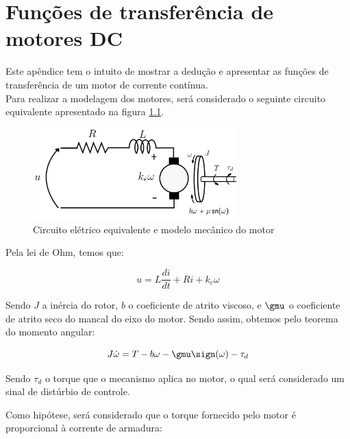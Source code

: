 \documentclass[]{politex}
\begin{document}
\chapter{Funções de transferência de motores DC} \label{ap:FuncoesDeTransferencia}

Este apêndice tem o intuito de mostrar a dedução e apresentar as funções de transferência de um motor de corrente contínua. \\

Para realizar a modelagem dos motores, será considerado o seguinte circuito equivalente apresentado na figura \ref{fig:CEM1}.


\begin{figure}[!h]
     \centering
     \includegraphics[width=0.7\textwidth]{imagens/DCMotor.png}
     \caption{Circuito elétrico equivalente e modelo mecânico do motor}
     \label{fig:CEM1}
\end{figure}


Pela lei de Ohm, temos que:

\begin{equation}
\label{eletricaMotor}
	   u = L \frac{di}{dt} + R i + k_{e} \omega
\end{equation}

Sendo $J$ a inércia do rotor, $b$ o coeficiente de atrito viscoso, e $\gmu$ o coeficiente de atrito seco do mancal do eixo do motor. Sendo assim, obtemos pelo teorema do momento angular:

\begin{equation}
\label{torqueDist}
    J \dot{\omega} = T - b\omega - \gmu \sign(\omega) - \tau_{d}
\end{equation}

Sendo $\tau_{d} $ o torque que o mecanismo aplica no motor, o qual será considerado um sinal de distúrbio de controle.

Como hipótese, será considerado que o torque fornecido pelo motor é proporcional à corrente de armadura:
\end{document}
